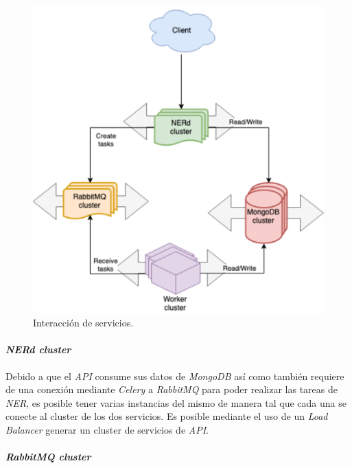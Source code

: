 \documentclass[12pt,a4paper,]{scrartcl}
\let\oldparagraph\paragraph
\renewcommand{\paragraph}[1]{\oldparagraph{#1}\mbox{}}
\begin{document}
\begin{figure}[H]

{\centering \includegraphics{assets/physical/overview.pdf} 

}

\caption{Interacción de servicios.}\label{fig:physical-overview}
\end{figure}

\hypertarget{nerd-cluster}{%
\paragraph{\texorpdfstring{\emph{NERd cluster}}{NERd cluster}}\label{nerd-cluster}}

Debido a que el \emph{API} consume sus datos de \emph{MongoDB} así como también requiere de una conexión mediante \emph{Celery} a \emph{RabbitMQ} para poder realizar las tareas de \emph{NER}, es posible tener varias instancias del mismo de manera tal que cada una se conecte al cluster de los dos servicios. Es posible mediante el uso de un \emph{Load Balancer} generar un cluster de servicios de \emph{API}.

\hypertarget{rabbitmq-cluster}{%
\paragraph{\texorpdfstring{\emph{RabbitMQ cluster}}{RabbitMQ cluster}}\label{rabbitmq-cluster}}
\end{document}
